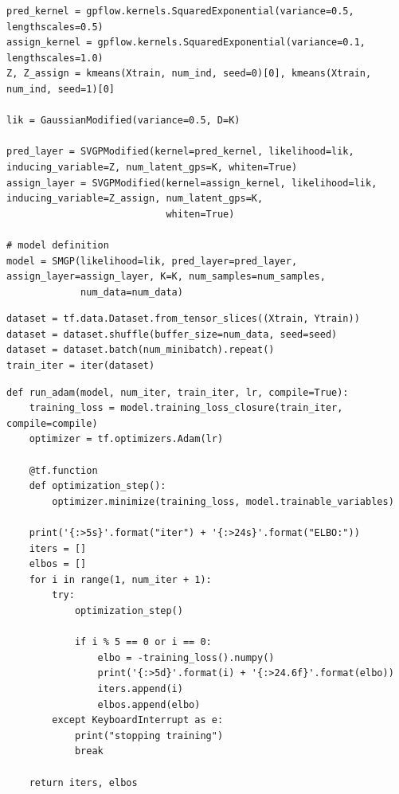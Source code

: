 \documentclass[12pt,a4paper]{report}
\theoremstyle{definition}
\begin{document}
\begin{lstlisting}[label=code:SMGPCreateModels,  caption={Creating kernels and inducing points to pass into SVGP layer. The SMGP model is then instantiated.}]
pred_kernel = gpflow.kernels.SquaredExponential(variance=0.5, lengthscales=0.5)
assign_kernel = gpflow.kernels.SquaredExponential(variance=0.1, lengthscales=1.0)
Z, Z_assign = kmeans(Xtrain, num_ind, seed=0)[0], kmeans(Xtrain, num_ind, seed=1)[0]

lik = GaussianModified(variance=0.5, D=K)

pred_layer = SVGPModified(kernel=pred_kernel, likelihood=lik, inducing_variable=Z, num_latent_gps=K, whiten=True)
assign_layer = SVGPModified(kernel=assign_kernel, likelihood=lik, inducing_variable=Z_assign, num_latent_gps=K,
                            whiten=True)

# model definition
model = SMGP(likelihood=lik, pred_layer=pred_layer, assign_layer=assign_layer, K=K, num_samples=num_samples,
             num_data=num_data)
\end{lstlisting}

\begin{lstlisting}[label=code:SMGPBatching,  caption={Dataset batching}]
dataset = tf.data.Dataset.from_tensor_slices((Xtrain, Ytrain))
dataset = dataset.shuffle(buffer_size=num_data, seed=seed)
dataset = dataset.batch(num_minibatch).repeat()
train_iter = iter(dataset)
\end{lstlisting}

\begin{lstlisting}[label=code:SMGPTrainingLoop,  caption={Training loop for SMGP}]
def run_adam(model, num_iter, train_iter, lr, compile=True):
    training_loss = model.training_loss_closure(train_iter, compile=compile)
    optimizer = tf.optimizers.Adam(lr)

    @tf.function
    def optimization_step():
        optimizer.minimize(training_loss, model.trainable_variables)

    print('{:>5s}'.format("iter") + '{:>24s}'.format("ELBO:"))
    iters = []
    elbos = []
    for i in range(1, num_iter + 1):
        try:
            optimization_step()

            if i % 5 == 0 or i == 0:
                elbo = -training_loss().numpy()
                print('{:>5d}'.format(i) + '{:>24.6f}'.format(elbo))
                iters.append(i)
                elbos.append(elbo)
        except KeyboardInterrupt as e:
            print("stopping training")
            break

    return iters, elbos
\end{lstlisting}
\end{document}
